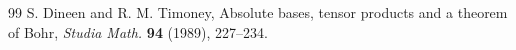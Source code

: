 \documentclass[a4paper,11pt, reqno]{amsart}
\theoremstyle{definition}
\begin{document}
\begin{thebibliography}{99}
	 {\sc S. Dineen} and {\sc R. M. Timoney}, Absolute bases, tensor products and a theorem of Bohr, \textit{Studia Math.} \textbf{94} (1989), 227--234.
	
	
	
	
	
	
	
	
	
	
	
	
	
	

\end{thebibliography}
\end{document}
